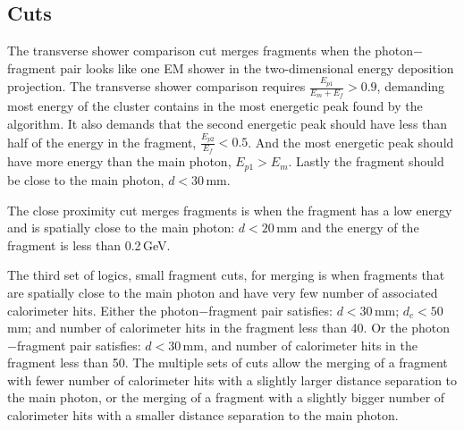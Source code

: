 
\subsection{Cuts}

The transverse shower comparison cut merges fragments when the photon$-$fragment pair looks like one EM shower in the two-dimensional energy deposition projection. The transverse shower comparison requires $\frac{E_{p1}}{E_m + E_f} > 0.9 $, demanding  most energy of the cluster contains in the most energetic peak found by the  \peakFinding algorithm. It also demands that the second energetic peak should have less than half of the energy in the fragment,  $\frac{E_{p2}}{E_f} < 0.5 $. And the most energetic peak should have more energy than the main photon,   $E_{p1} > E_m$. Lastly the fragment should be close to the main photon, $d < 30 $\,mm.



The close proximity cut merges fragments  is when the fragment has a low energy and is spatially close to the main photon: $d < 20 $\,mm and the energy of the fragment is less than 0.2\,GeV.



The third set of logics, small fragment cuts,  for merging is when fragments that are spatially close to the main photon and have very few number of associated calorimeter hits. Either the  photon$-$fragment pair satisfies:  $d < 30 $\,mm; $d_c < 50 $\,mm; and number of calorimeter hits in the fragment less than 40. Or the  photon$-$fragment pair satisfies: $d < 30 $\,mm, and number of calorimeter hits in the fragment less than 50. The multiple sets of cuts allow the merging of a fragment with fewer number of  calorimeter hits with a slightly larger distance separation to the main photon, or the merging of a fragment with a slightly bigger number of  calorimeter hits with a smaller distance separation to the main photon.

